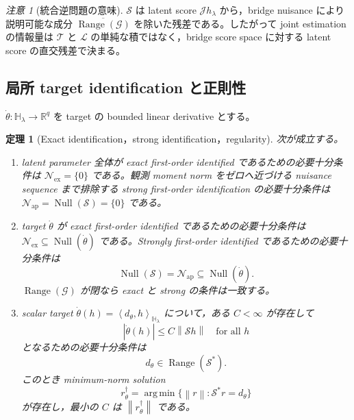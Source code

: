 \documentclass[11pt,a4paper]{ltjsarticle}
\newtheorem{theorem}{定理}[section]
\theoremstyle{remark}
\newtheorem{remark}{注意}[section]
\newcommand{\R}{\mathbb R}
\newcommand{\abs}[1]{\left|#1\right|}
\newcommand{\norm}[1]{\left\lVert#1\right\rVert}
\newcommand{\inner}[2]{\left\langle#1,#2\right\rangle}
\newcommand{\cN}{\mathcal N}
\newcommand{\Top}{\mathscr T}
\newcommand{\Lop}{\mathscr L}
\newcommand{\Gop}{\mathscr G}
\newcommand{\Jop}{\mathscr J}
\newcommand{\Sop}{\mathscr S}
\newcommand{\Null}{\operatorname{Null}}
\newcommand{\Range}{\operatorname{Range}}
\newcommand{\argmin}{\operatorname*{arg\,min}}
\begin{document}
\begin{remark}[統合逆問題の意味]
$\Sop$ は latent score $\Jop h_\lambda$ から，bridge nuisance により説明可能な成分 $\overline{\Range(\Gop)}$ を除いた残差である。したがって joint estimation の情報量は $\Top$ と $\Lop$ の単純な積ではなく，bridge score space に対する latent score の直交残差で決まる。
\end{remark}

\subsection{局所 target identification と正則性}
$\dot\theta:\mathbb H_\lambda\to\R^q$ を target の bounded linear derivative とする。

\begin{theorem}[Exact identification，strong identification，regularity]\label{thm:localeffective}
次が成立する。
\begin{enumerate}[label=(\roman*)]
\item latent parameter 全体が exact first-order identified であるための必要十分条件は $\cN_{\mathrm{ex}}=\{0\}$ である。観測 moment norm をゼロへ近づける nuisance sequence まで排除する strong first-order identification の必要十分条件は $\cN_{\mathrm{ap}}=\Null(\Sop)=\{0\}$ である。
\item target $\dot\theta$ が exact first-order identified であるための必要十分条件は $\cN_{\mathrm{ex}}\subseteq\Null(\dot\theta)$ である。Strongly first-order identified であるための必要十分条件は
\begin{equation}
\Null(\Sop)=\cN_{\mathrm{ap}}\subseteq\Null(\dot\theta).
\label{eq:targetnull}
\end{equation}
$\Range(\Gop)$ が閉なら exact と strong の条件は一致する。
\item scalar target $\dot\theta(h)=\inner{d_\theta}{h}_{\mathbb H_\lambda}$ について，ある $C<\infty$ が存在して
\begin{equation}
\abs{\dot\theta(h)}\le C\norm{\Sop h}
\quad\text{for all }h
\label{eq:targetstable}
\end{equation}
となるための必要十分条件は
\begin{equation}
 d_\theta\in\Range(\Sop^*).
\label{eq:rangeSstar}
\end{equation}
このとき minimum-norm solution
\[
r_\theta^\dagger=\argmin\{\norm r:\Sop^*r=d_\theta\}
\]
が存在し，最小の $C$ は $\norm{r_\theta^\dagger}$ である。
\end{enumerate}
\end{theorem}
\end{document}
